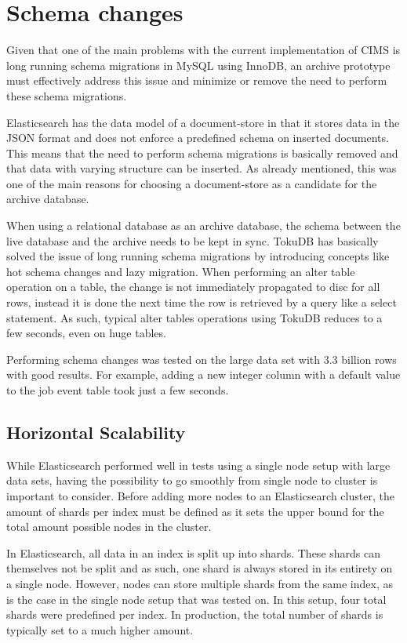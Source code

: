 \section{Schema changes}
Given that one of the main problems with the current implementation of CIMS is long running schema migrations in MySQL using InnoDB, an archive prototype must effectively address this issue and minimize or remove the need to perform these schema migrations.

Elasticsearch has the data model of a document-store in that it stores data in the JSON format and does not enforce a predefined schema on inserted documents. This means that the need to perform schema migrations is basically removed and that data with varying structure can be inserted. As already mentioned, this was one of the main reasons for choosing a document-store as a candidate for the archive database.

When using a relational database as an archive database, the schema between the live database and the archive needs to be kept in sync. TokuDB has basically solved the issue of long running schema migrations by introducing concepts like hot schema changes and lazy migration. When performing an alter table operation on a table, the change is not immediately propagated to disc for all rows, instead it is done the next time the row is retrieved by a query like a select statement. As such, typical alter tables operations using TokuDB reduces to a few seconds, even on huge tables.

Performing schema changes was tested on the large data set with 3.3 billion rows with good results. For example, adding a new integer column with a default value to the job event table took just a few seconds.

\subsection{Horizontal Scalability}
While Elasticsearch performed well in tests using a single node setup with large data sets, having the possibility to go smoothly from single node to cluster is important to consider. Before adding more nodes to an Elasticsearch cluster, the amount of shards per index must be defined as it sets the upper bound for the total amount possible nodes in the cluster.

In Elasticsearch, all data in an index is split up into shards. These shards can themselves not be split and as such, one shard is always stored in its entirety on a single node. However, nodes can store multiple shards from the same index, as is the case in the single node setup that was tested on. In this setup, four total shards were predefined per index. In production, the total number of shards is typically set to a much higher amount. 


